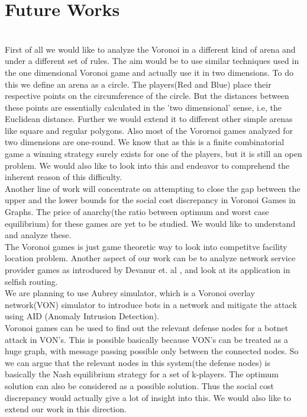 \documentclass[12pt]{article}
\begin{document}
\section{Future Works}
\\
First of all we would like to analyze the Voronoi in a different kind of arena and under a different set of rules. The aim would be to use similar techniques used in the one dimensional Voronoi game and actually use it in two dimensions. To do this we define an arena as a circle. The players(Red and Blue) place their respective points on the circumference of the circle. But the distances between these points are essentially calculated in the 'two dimensional' sense, i.e, the Euclidean distance. Further we would extend it to different other simple arenas like square and regular polygons. Also most of the Vorornoi games analyzed for two dimensions are one-round. We know that as this is a finite combinatorial game a winning strategy surely exists for one of the players, but it is still an open problem. We would also like to look into this and endeavor to comprehend the inherent reason of this difficulty.  \\

Another line of work will concentrate on attempting to close the gap between the upper and the lower bounds for the social cost discrepancy in Voronoi Games in Graphs. The price of anarchy(the ratio between optimum and worst case equilibrium) for these games are yet to be studied. We would like to understand and analyze these. \\

The Voronoi games is just game theoretic way to look into competitve facility location problem. Another aspect of our work can be to analyze network service provider games as introduced by Devanur et. al \cite{Devanur05priceof} , and look at its application in selfish routing. \\

We are planning to use Aubrey simulator, which is a Voronoi overlay network(VON) simulator to introduce bots in a network and mitigate the attack using AID (Anomaly Intrusion Detection). \\

Voronoi games can be used to find out the relevant defense nodes for a botnet attack in VON's. This is possible basically because VON's can be treated as a huge graph, with message passing possible only between the connected nodes. So we can argue that the relevant nodes in this system(the defense nodes) is basically the Nash equilibrium strategy for a set of k-players. The optimum solution can also be considered as a possible solution. Thus the social cost discrepancy would actually give a lot of insight into this. We would also like to extend our work in this direction. \\
\newpage
\end{document}
